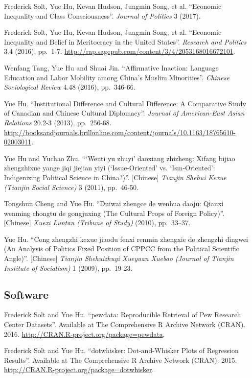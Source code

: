\documentclass[10.5pt,]{article}
\begin{document}
Frederick Solt, Yue Hu, Kevan Hudson, Jungmin Song, et al. ``Economic
Inequality and Class Consciousness''. \emph{Journal of Politics} 3
(2017).

Frederick Solt, Yue Hu, Kevan Hudson, Jungmin Song, et al. ``Economic
Inequality and Belief in Meritocracy in the United States''.
\emph{Research and Politics} 3.4 (2016), pp.~1-7.
\url{http://rap.sagepub.com/content/3/4/2053168016672101}.

Wenfang Tang, Yue Hu and Shuai Jin. ``Affirmative Inaction: Language
Education and Labor Mobility among China's Muslim Minorities''.
\emph{Chinese Sociological Review} 4.48 (2016), pp.~346-66.

Yue Hu. ``Institutional Difference and Cultural Difference: A
Comparative Study of Canadian and Chinese Cultural Diplomacy''.
\emph{Journal of American-East Asian Relations} 20.2-3 (2013),
pp.~256-68.
\url{http://booksandjournals.brillonline.com/content/journals/10.1163/18765610-02003011}.

Yue Hu and Yuchao Zhu. ```Wenti yu zhuyi' daoxiang zhizheng: Xifang
bijiao zhengzhixue yange jiqi jiejian yiyi (`Issue-Oriented' vs.
`Ism-Oriented': Indigenizing Political Science in China?)''.
{[}Chinese{]} \emph{Tianjin Shehui Kexue (Tianjin Social Science)} 3
(2011), pp.~46-50.

Tongshun Cheng and Yue Hu. ``Duiwai zhengce de wenhua daoju: Qianxi
wenming chongtu de gongjuxing (The Cultural Props of Foreign Policy)''.
{[}Chinese{]} \emph{Xuexi Luntan (Tribune of Study)} (2010), pp.~33--37.

Yue Hu. ``Cong zhengzhi kexue jiaodu fenxi renmin zhengxie de zhengzhi
dingwei (An Analysis of Politics Fixed Position of CPPCC from the
Political Scientific Angle)''. {[}Chinese{]}
\emph{Tianjin Shehuizhuyi Xueyuan Xuebao (Journal of Tianjin Institute of Socialism)}
1 (2009), pp.~19-23.

\subsection{Software}\label{software}

Frederick Solt and Yue Hu. ``pewdata: Reproducible Retrieval of Pew
Research Center Datasets''. Available at The Comprehensive R Archive
Network (CRAN). 2016. \url{http://CRAN.R-project.org/package=pewdata}.

Frederick Solt and Yue Hu. ``dotwhisker: Dot-and-Whisker Plots of
Regression Results''. Available at The Comprehensive R Archive Network
(CRAN). 2015. \url{http://CRAN.R-project.org/package=dotwhisker}.
\end{document}
